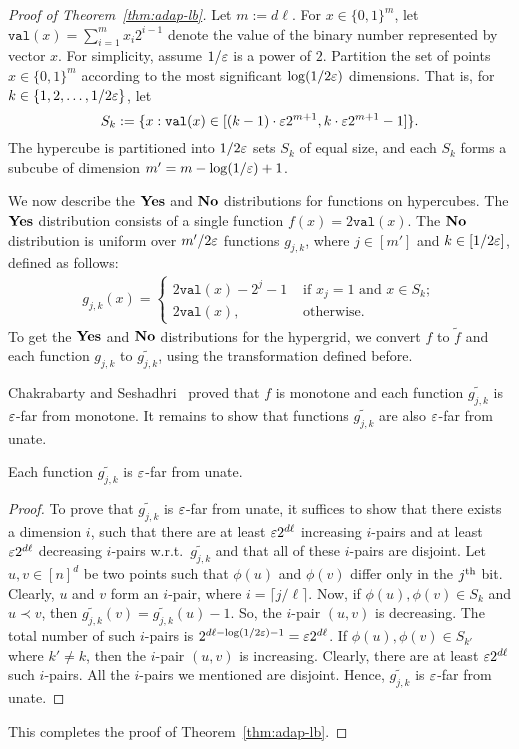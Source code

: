 \begin{proof}[Proof of Theorem~\ref{thm:adap-lb}]
Let $m:= d\ell$. For $x \in \{0,1\}^m$, let $\texttt{val}(x) = \sum\nolimits_{i=1}^m x_i 2^{i-1}$ denote the value of the binary number represented by vector $x$. For simplicity, assume $1/\varepsilon$ is a power of $2$.
Partition the set of points $x \in \{0,1\}^m$ according to the most significant $\log(1/2\varepsilon)$ dimensions.
That is, for $k \in \{1,2,\ldots, 1/2\varepsilon\}$, let
$$S_k := \{x: \texttt{val}(x) \in [(k-1)\cdot \varepsilon 2^{m+1}, k\cdot\varepsilon 2^{m+1} - 1]\}.$$
The hypercube is partitioned into $1/2\varepsilon$ sets $S_k$ of equal size, and each $S_k$ forms a subcube of dimension $m' = m - \log(1/\varepsilon) + 1$.

We now describe the $\mathbf{Yes}$ and $\mathbf {No}$ distributions for functions on hypercubes.
The $\mathbf{Yes}$ distribution consists of a single function $f(x) = 2 \texttt{val}(x)$.
The $\mathbf {No}$ distribution is uniform over $m'/2\varepsilon$ functions $g_{j,k}$, where $j \in [m']$ and $k \in [1/2\varepsilon]$, defined as follows:
\begin{align*}
    g_{j,k}(x) =
    \begin{cases}
        2\texttt{val}(x) - 2^j - 1 &\text{ if } x_j = 1 \text{ and } x \in S_k;\\
        2\texttt{val}(x), &\text{ otherwise.}
    \end{cases}
\end{align*}
To get the $\mathbf{Yes}$ and $\mathbf {No}$ distributions for the hypergrid, we convert $f$ to $\widetilde{f}$ and each function $g_{j,k}$ to $\widetilde{g_{j,k}}$, using the transformation defined before.


Chakrabarty and Seshadhri~\cite{CS14} proved that $f$ is monotone and each function $\widetilde{g_{j,k}}$  is $\varepsilon$-far from monotone. It remains to show that functions $\widetilde{g_{j,k}}$ are also $\varepsilon$-far from unate.

\begin{claim}
Each function $\widetilde{g_{j,k}}$ is $\varepsilon$-far from unate.
\end{claim}

\begin{proof}
To prove that $\widetilde{g_{j,k}}$ is $\varepsilon$-far from unate, it suffices to show that there exists a dimension $i$, such that there are at least $\varepsilon 2^{d\ell}$ increasing $i$-pairs and at least $\varepsilon 2^{d\ell}$ decreasing $i$-pairs w.r.t.\ $\widetilde{g_{j,k}}$ and that all of these $i$-pairs are disjoint. Let $u,v \in [n]^d$ be two points such that $\phi(u)$ and $\phi(v)$ differ only in the ${j}^{\mathrm{th}}$ bit. Clearly, $u$ and $v$ form an $i$-pair, where $i =\lceil j/\ell \rceil$. Now, if $\phi(u),\phi(v) \in S_k$ and $u \prec v $, then $\widetilde{g_{j,k}}(v) = \widetilde{g_{j,k}}(u) - 1$. So, the $i$-pair $(u,v)$ is decreasing. The total number of such $i$-pairs is  $2^{d\ell - \log(1/2\varepsilon) - 1} = \varepsilon 2^{d\ell}$. If $\phi(u),\phi(v) \in S_{k'}$ where $k' \neq k$, then the $i$-pair $(u,v)$ is increasing. Clearly, there are at least $\varepsilon 2^{d\ell}$ such $i$-pairs. All the $i$-pairs we mentioned are disjoint.
Hence, $\widetilde{g_{j,k}}$ is $\varepsilon$-far from unate.
\end{proof}
This completes the proof of Theorem~\ref{thm:adap-lb}.
\end{proof}

